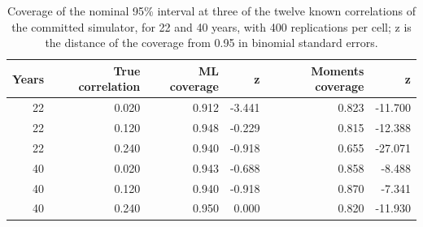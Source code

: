 \begin{table}[htbp]
\centering
\small
\caption{Coverage of the nominal 95\% interval at three of the twelve known correlations of the committed simulator, for 22 and 40 years, with 400 replications per cell; z is the distance of the coverage from 0.95 in binomial standard errors.}
\label{tab:grid}
\begin{tabular}{rrrrrr}
\toprule
Years & True correlation & ML coverage & z & Moments coverage & z \\
\midrule
22 & 0.020 & 0.912 & -3.441 & 0.823 & -11.700 \\
22 & 0.120 & 0.948 & -0.229 & 0.815 & -12.388 \\
22 & 0.240 & 0.940 & -0.918 & 0.655 & -27.071 \\
40 & 0.020 & 0.943 & -0.688 & 0.858 & -8.488 \\
40 & 0.120 & 0.940 & -0.918 & 0.870 & -7.341 \\
40 & 0.240 & 0.950 & 0.000 & 0.820 & -11.930 \\
\bottomrule
\end{tabular}
\end{table}
